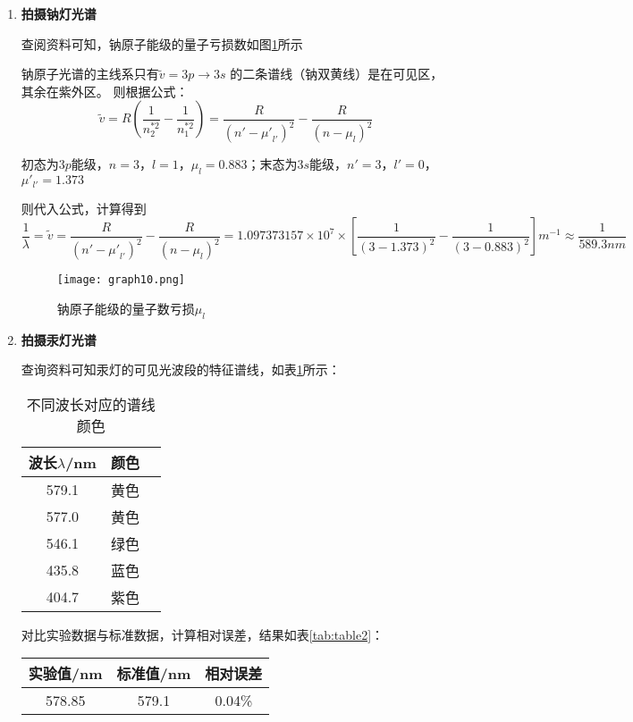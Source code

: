 \documentclass[dvipsnames, svgnames,a4paper,11pt]{article}
\begin{document}
		\begin{enumerate}
			\item \textbf{拍摄钠灯光谱}
			
				查阅资料可知，钠原子能级的量子亏损数如图\ref{fig:graph10}所示
				
				钠原子光谱的主线系只有$\widetilde{v}=3p \rightarrow 3s$ 的二条谱线（钠双黄线）是在可见区，其余在紫外区。
				则根据公式：
				\[
				\widetilde{v}=R(\frac{1}{n_2^{*2}}-\frac{1}{n_1^{*2}})=\frac{R}{{(n'-{\mu'}_{l'})}^2}-\frac{R}{{(n-\mu_l)}^2}
				\]
				
				初态为$3p$能级，$n=3$，$l=1$，$\mu_l=0.883$；末态为$3s$能级，$n'=3$，$l'=0$，$\mu'_{l'}=1.373$
				
				则代入公式，计算得到
				\[ \frac{1}{\lambda}=\widetilde{v}=\frac{R}{{(n'-{\mu'}_{l'})}^2}-\frac{R}{{(n-\mu_l)}^2}=1.097373157\times10^{7}\times[\frac{1}{(3-1.373)^2}-\frac{1}{(3-0.883)^2}]m^{-1}\approx\frac{1}{589.3nm}
				\]
				
				\begin{figure}[htbp]
					\centering
					\texttt{[image: graph10.png]}
					\caption{钠原子能级的量子数亏损$\mu_l$}
					\label{fig:graph10}
				\end{figure}
			
			\item \textbf{拍摄汞灯光谱}
				
				查询资料可知汞灯的可见光波段的特征谱线，如表\ref{tab:table1}所示：
				
				\begin{table}[htbp]
					\centering
					\begin{tabular}{|c|c|c|}
						\hline
						波长$\lambda$/nm & 颜色 \\
						\hline
						579.1 & 黄色 \\
						\hline
						577.0 & 黄色 \\
						\hline
						546.1 & 绿色 \\
						\hline
						435.8 & 蓝色 \\
						\hline
						404.7 & 紫色 \\
						\hline
							
					\end{tabular}
					\caption{不同波长对应的谱线颜色}
					\label{tab:table1}
				\end{table}
				
				对比实验数据与标准数据，计算相对误差，结果如表\ref{tab:table2}：
				
				\begin{table}[htbp]
					\centering
					\begin{tabular}{|c|c|c|}
						\hline
						实验值/nm & 标准值/nm & 相对误差    \\
						\hline
						578.85 & 579.1  & 0.04\%  \\
						

\end{tabular}
\end{table}
\end{enumerate}
\end{document}
